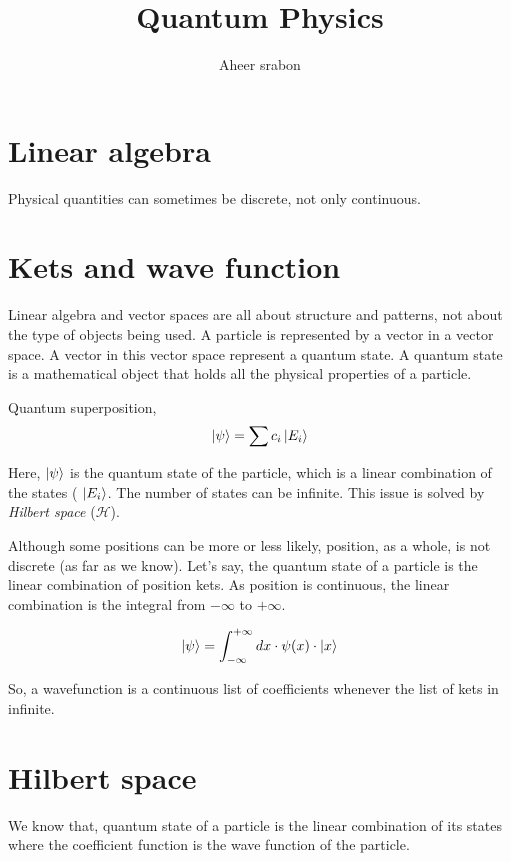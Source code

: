 

\title{Quantum Physics}
\author{Aheer srabon}
\date{}


\maketitle

	\section{Linear algebra}
	\noindent Physical quantities can sometimes be discrete,
	not only continuous.

	\section{Kets and wave function}
	\noindent  Linear algebra and vector spaces are all about
	structure and patterns, not about the type of objects being
	used. A particle is represented by a vector in a vector space.
	A vector in this vector space represent a quantum state. A
	quantum state is a mathematical object that holds all the
	physical properties of a particle.

	\noindent Quantum superposition,
	\begin{equation}
		\ket{\psi} = \sum c_i \ket{E_i}
		\label{eq:1}
	\end{equation}

	\noindent Here, $ \ket{\psi} $ is the quantum state of the 
	particle, which is a linear combination of the states (
	$ \ket{E_i} $. The number of states can be infinite. This issue
	is solved by \emph{Hilbert space} ($ \mathcal{H} $).

	\noindent Although some positions can be more or less likely,
	position, as a whole, is not discrete (as far as we know).
	Let's say, the quantum state of a particle is the linear combination
	of position kets. As position is continuous, the linear combination
	is the integral from $ -\infty $ to $ +\infty $.

	\begin{equation}
		\ket{\psi} = \int_{-\infty}^{+\infty} dx \cdot \psi(x) \cdot \ket{x}
		\label{eq:2}
	\end{equation}

	\noindent So, a wavefunction is a continuous list of coefficients whenever
	the list of kets in infinite.

	\section{Hilbert space}
	\noindent We know that, quantum state of a particle is the linear combination
	of its states where the coefficient function is the wave function of the
	particle.

